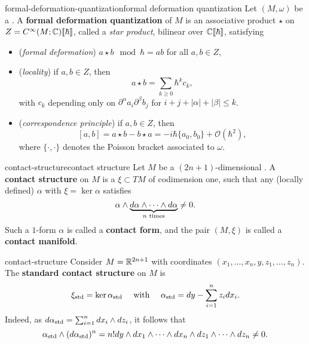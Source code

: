 \begin{topic}{formal-deformation-quantization}{formal deformation quantization}
    Let $(M, \omega)$ be a . A \textbf{formal deformation quantization} of $M$ is an associative product $\star$ on $Z = C^\infty(M; \mathbb{C}) \llbracket \hbar \rrbracket$, called a \textit{star product}, bilinear over $\mathbb{C} \llbracket \hbar \rrbracket$, satisfying
    \begin{itemize}
        \item (\textit{formal deformation}) $a \star b \mod \hbar = ab$ for all $a, b \in Z$,
        \item (\textit{locality}) if $a, b \in Z$, then
        \[ a \star b = \sum_{k \ge 0} \hbar^k c_k , \]
        with $c_k$ depending only on $\partial^\alpha a_i \partial^\beta b_j$ for $i + j + |\alpha| + |\beta| \le k$.
        \item (\textit{correspondence principle}) if $a, b \in Z$, then
        \[ [a, b] = a \star b - b \star a = - i \hbar \{ a_0, b_0 \} + \mathcal{O}(\hbar^2) , \]
        where $\{ \cdot, \cdot \}$ denotes the Poisson bracket associated to $\omega$.
    \end{itemize}
\end{topic}

\begin{topic}{contact-structure}{contact structure}
    Let $M$ be a $(2n + 1)$-dimensional . A \textbf{contact structure} on $M$ is a  $\xi \subset TM$ of codimension one, such that any (locally defined)  $\alpha$ with $\xi = \ker \alpha$ satisfies
    \[ \alpha \wedge \underbrace{d \alpha \wedge \cdots \wedge d \alpha}_{n \textup{ times}} \ne 0 . \]
    Such a $1$-form $\alpha$ is called a \textbf{contact form}, and the pair $(M, \xi)$ is called a \textbf{contact manifold}.
\end{topic}

\begin{example}{contact-structure}
    Consider $M = \mathbb{R}^{2n + 1}$ with coordinates $(x_1, \ldots, x_n, y, z_1, \ldots, z_n)$. The \textbf{standard contact structure} on $M$ is
    \[ \xi_\textup{std} = \ker \alpha_\textup{std} \quad \textup{ with } \quad \alpha_\textup{std} = dy - \sum_{i = 1}^{n} z_i d x_i . \]
    Indeed, as $d \alpha_\textup{std} = \sum_{i = 1}^{n} dx_i \wedge dz_i$, it follows that
    \[ \alpha_\textup{std} \wedge (d \alpha_\textup{std})^n = n! dy \wedge dx_1 \wedge \cdots \wedge dx_n \wedge dz_1 \wedge \cdots \wedge dz_n \ne 0 . \]
\end{example}

